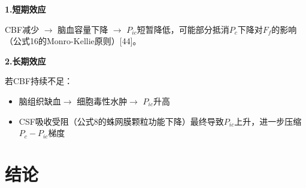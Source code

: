 \documentclass[12pt]{article}
\begin{document}

\noindent \textbf{1.短期效应}

CBF减少 $\rightarrow$ 脑血容量下降 $\rightarrow$ $P_{ic}$短暂降低，可能部分抵消$P_c$下降对$F_f$的影响（公式16的Monro-Kellie原则）[44]。

\noindent \textbf{2.长期效应}

若CBF持续不足：
\begin{itemize}
    \item 脑组织缺血$\rightarrow$ 细胞毒性水肿$\rightarrow$ $P_{ic} $升高
    \item CSF吸收受阻（公式8的蛛网膜颗粒功能下降）最终导致$P_{ic} $上升，进一步压缩$P_c - P_{ic}$梯度
\end{itemize}

\section{结论}
\end{document}
